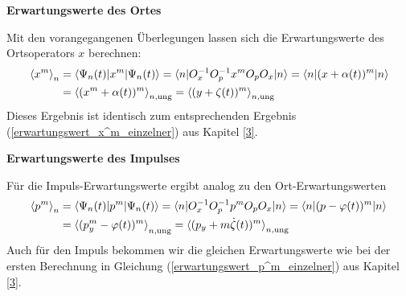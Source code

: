   \textbf{Erwartungswerte des Ortes}

  Mit den vorangegangenen Überlegungen lassen sich die Erwartungswerte des Ortsoperators $x$ berechnen:
  \begin{align}
    \braket{x^m}_n&=\braket{\Psi_n(t)|x^m|\Psi_n(t)}=\braket{n|O_x^{-1}O_p^{-1}x^mO_pO_x|n}=\braket{n|(x+\alpha(t))^m|n}\notag\\
    &=\braket{(x^m+\alpha(t))^m}_{n,\text{ung}}
    =\braket{(y+\zeta(t))^m}_{n,\text{ung}}
  \end{align}
  Dieses Ergebnis ist identisch zum entsprechenden Ergebnis (\ref{erwartungswert_x^m_einzelner}) aus Kapitel \ref{3}.

  \textbf{Erwartungswerte des Impulses}

  Für die Impuls-Erwartungswerte ergibt analog zu den Ort-Erwartungswerten
  \begin{align}
    \braket{p^m}_n&=\braket{\Psi_n(t)|p^m|\Psi_n(t)}=\braket{n|O_x^{-1}O_p^{-1}p^mO_pO_x|n}=\braket{n|(p-\varphi(t))^m|n}\notag\\
    &=\braket{(p_y^m-\varphi(t))^m}_{n,\text{ung}}
    =\braket{(p_y+m\dot\zeta(t))^m}_{n,\text{ung}}
  \end{align}
  Auch für den Impuls bekommen wir die gleichen Erwartungswerte wie bei der ersten Berechnung in Gleichung (\ref{erwartungswert_p^m_einzelner}) aus Kapitel \ref{3}.


